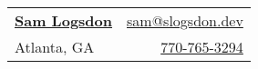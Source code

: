 \documentclass[letterpaper,11pt]{article}
\begin{document}
    \newcommand{\mywebheader}{
    \begin{tabular*}{7in}{l@{\extracolsep{\fill}}r}
        \href{https://slogsdon.dev}{\textbf{\LARGE Sam Logsdon}} & \href{mailto:sam@slogsdon.dev}{sam@slogsdon.dev}\\
        {Atlanta, GA}

        &
        \href{tel:+17707653294}{770-765-3294}
    \end{tabular*}
    \\
    \vspace{0.1in}
    }

    \mywebheader

    
\end{document}
